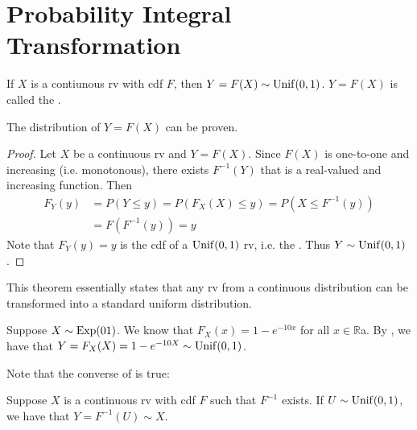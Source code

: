 \documentclass[notoc,notitlepage]{tufte-book}
\begin{document}
\section{Probability Integral Transformation}%
\label{sec:probability_integral_transformation}


\begin{thm}
\label{thm:probability_integral_transformation}
  If $X$ is a contiunous rv with cdf $F$, then $Y = F(X) \sim \operatorname{Unif}(0, 1)$. $Y = F(X)$ is called the .
\end{thm}

\begin{note}
  The distribution of $Y = F(X)$ can be proven.
\end{note}

\begin{proof}
  Let $X$ be a continuous rv and $Y = F(X)$. Since $F(X)$ is one-to-one and increasing (i.e. monotonous), there exists $F^{-1}(Y)$ that is a real-valued and increasing function. Then
  \begin{align*}
    F_Y(y) &= P(Y \leq y) = P( F_X(X) \leq y ) = P(X \leq F^{-1}(y) ) \\
           &= F( F^{-1}(y) ) = y
  \end{align*}
  Note that $F_Y(y) = y$ is the cdf of a $\operatorname{Unif}(0, 1)$ rv, i.e. the . Thus $Y \sim \operatorname{Unif}(0, 1)$.
\end{proof}

\begin{note}
  This theorem essentially states that any rv from a continuous distribution can be transformed into a standard uniform distribution.
\end{note}

\begin{eg}[Example 2.11]
  Suppose $X \sim \operatorname{Exp}(0 1)$. We know that $F_X(x) = 1 - e^{-10x}$ for all $x \in \mathbb{R}$a. By , we have that $Y = F_X(X) = 1 - e^{-10X} \sim \operatorname{Unif}(0, 1)$.
\end{eg}

  Note that the converse of  is true:

\begin{thm}
\label{thm:converse_of_probability_integral_transformation}
  Suppose $X$ is a continuous rv with cdf $F$ such that $F^{-1}$ exists. If $U \sim \operatorname{Unif}(0, 1)$, we have that $Y = F^{-1}(U) \sim X$.
\end{thm}
\end{document}
